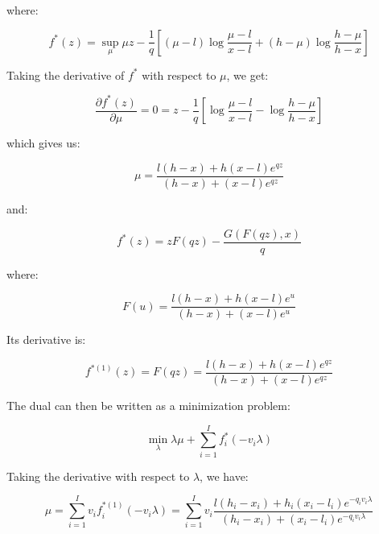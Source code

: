 \documentclass{tex/note}
\begin{document}
where:

\begin{equation*}
f^* \left( z \right) = \sup_{\mu} \mu z - \frac{1}{q} \left[ \left( \mu - l  \right) \log \frac{\mu - l}{x - l} + \left( h - \mu \right) \log \frac{h - \mu}{h - x} \right]
\end{equation*}

Taking the derivative of $f^*$ with respect to $\mu$, we get:

\begin{equation*}
\frac{\partial f^* \left( z \right)}{\partial \mu} = 0 = z - \frac{1}{q} \left[ \log \frac{\mu - l}{x - l} - \log \frac{h - \mu}{h - x} \right]
\end{equation*}

which gives us:

\begin{equation*}
\mu = \frac{l \left( h - x \right) + h \left( x - l \right) e^{q z}}{\left( h - x \right) + \left( x - l \right) e^{q z}}
\end{equation*}

and:

\begin{equation*}
f^* \left( z \right) = z F \left( q z \right) - \frac{G \left( F \left( q z \right) , x \right)}{q}
\end{equation*}

where:

\begin{equation*}
F \left( u \right) = \frac{l \left( h - x \right) + h \left( x - l \right) e^u}{\left( h - x \right) + \left( x - l \right) e^u}
\end{equation*}

Its derivative is:

\begin{equation*}
f^{* \left( 1 \right)} \left( z \right) = F \left( q z \right) = \frac{l \left( h - x \right) + h \left( x - l \right) e^{qz}}{\left( h - x \right) + \left( x - l \right) e^{qz}}
\end{equation*}

The dual can then be written as a minimization problem:

\begin{equation*}
\min_\lambda \lambda \mu + \sum_{i = 1}^I f_i^* \left( - v_i \lambda \right)
\end{equation*}

Taking the derivative with respect to $\lambda$, we have:

\begin{equation*}
\mu = \sum_{i = 1}^I v_i f_i^{* \left( 1 \right)} \left( - v_i \lambda \right) = \sum_{i = 1}^I v_i \frac{l \left( h_i - x_i \right) + h_i \left( x_i - l_i \right) e^{-q_i v_i \lambda}}{\left( h_i - x_i \right) + \left( x_i - l_i \right) e^{-q_i v_i \lambda}}
\end{equation*}
\end{document}
